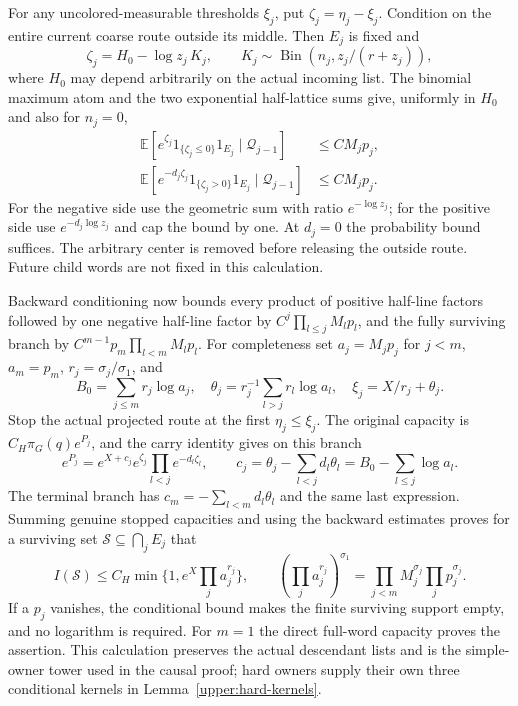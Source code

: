 For any uncolored-measurable thresholds $\xi_j$, put
$\zeta_j=\eta_j-\xi_j$. Condition on the entire current coarse route
outside its middle. Then $E_j$ is fixed and
\[
 \zeta_j=H_0-\log z_j\,K_j,\qquad
 K_j\sim\operatorname{Bin}(n_j,z_j/(r+z_j)),
\]
where $H_0$ may depend arbitrarily on the actual incoming list.
The binomial maximum atom and the two exponential half-lattice sums
give, uniformly in $H_0$ and also for $n_j=0$,
\begin{align*}
 \mathbb E[e^{\zeta_j}1_{\{\zeta_j\leq0\}}1_{E_j}
                  \mid\mathcal Q_{j-1}]&\leq C M_jp_j,\\
 \mathbb E[e^{-d_j\zeta_j}1_{\{\zeta_j>0\}}1_{E_j}
                  \mid\mathcal Q_{j-1}]&\leq C M_jp_j.
\end{align*}
For the negative side use the geometric sum with ratio $e^{-\log z_j}$;
for the positive side use $e^{-d_j\log z_j}$ and cap the bound by one.
At $d_j=0$ the probability bound suffices. The arbitrary center is
removed before releasing the outside route. Future child words are
not fixed in this calculation.

Backward conditioning now bounds every product of positive half-line
factors followed by one negative half-line factor by
$C^j\prod_{l\leq j}M_lp_l$, and the fully surviving branch by
$C^{m-1}p_m\prod_{l<m}M_lp_l$. For completeness set
$a_j=M_jp_j$ for $j<m$, $a_m=p_m$, $r_j=\sigma_j/\sigma_1$, and
\[
 B_0=\sum_{j\leq m}r_j\log a_j,\quad
 \theta_j=r_j^{-1}\sum_{l>j}r_l\log a_l,\quad
 \xi_j=X/r_j+\theta_j.
\]
Stop the actual projected route at the first $\eta_j\leq\xi_j$.
The original capacity is $C_H\pi_G(q)e^{P_j}$, and the carry identity
gives on this branch
\[
 e^{P_j}=e^{X+c_j}e^{\zeta_j}
             \prod_{l<j}e^{-d_l\zeta_l},\qquad
 c_j=\theta_j-\sum_{l<j}d_l\theta_l
     =B_0-\sum_{l\leq j}\log a_l.
\]
The terminal branch has $c_m=-\sum_{l<m}d_l\theta_l$ and the same
last expression. Summing genuine stopped capacities and using the
backward estimates proves for a surviving set $\mathcal S\subseteq
\bigcap_jE_j$ that
\[
 I(\mathcal S)\leq C_H
 \min\{1,e^X\prod_ja_j^{r_j}\},\qquad
 (\prod_ja_j^{r_j})^{\sigma_1}
 =\prod_{j<m}M_j^{\sigma_j}\prod_jp_j^{\sigma_j}.
\]
If a $p_j$ vanishes, the conditional bound makes the finite surviving
support empty, and no logarithm is required. For $m=1$ the direct
full-word capacity proves the assertion. This calculation preserves
the actual descendant lists and is the simple-owner tower used in
the causal proof; hard owners supply their own three conditional
kernels in Lemma~\ref{upper:hard-kernels}.

